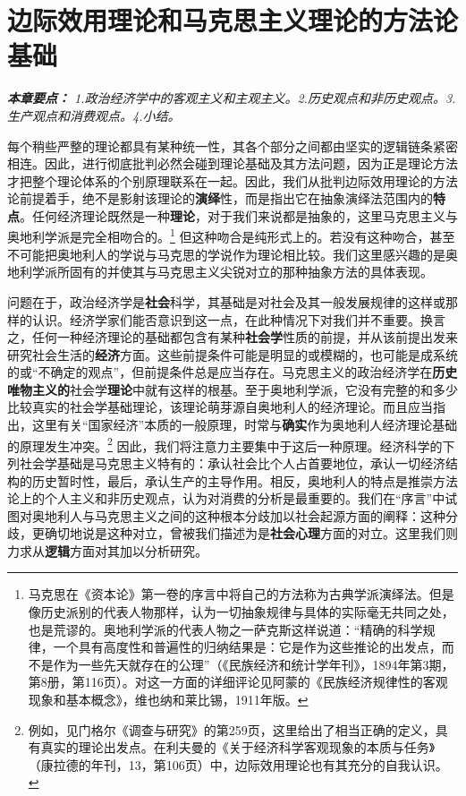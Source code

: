 \documentclass[fontset=fandol, a4paper, 12pt, openright]{ctexbook}
\renewenvironment{quote}
  {\list{}{\rightmargin\leftmargin}%
   \item\relax\small\itshape\color{darkgray}}
  {\endlist}
\begin{document}


\chapter{边际效用理论和马克思主义理论的方法论基础}

\begin{quote}
\small
\textbf{本章要点：} 1.政治经济学中的客观主义和主观主义。2.历史观点和非历史观点。3.生产观点和消费观点。4.小结。
\end{quote}

每个稍些严整的理论都具有某种统一性，其各个部分之间都由坚实的逻辑链条紧密相连。因此，进行彻底批判必然会碰到理论基础及其方法问题，因为正是理论方法才把整个理论体系的个别原理联系在一起。因此，我们从批判边际效用理论的方法论前提着手，绝不是影射该理论的\textbf{演绎}性，而是指出它在抽象演绎法范围内的\textbf{特点}。任何经济理论既然是一种\textbf{理论}，对于我们来说都是抽象的，这里马克思主义与奥地利学派是完全相吻合的。\footnote{马克思在《资本论》第一卷的序言中将自己的方法称为古典学派演绎法。但是像历史派别的代表人物那样，认为一切抽象规律与具体的实际毫无共同之处，也是荒谬的。奥地利学派的代表人物之一萨克斯这样说道：“精确的科学规律，一个具有高度性和普遍性的归纳结果是：它是作为这些推论的出发点，而不是作为一些先天就存在的公理”（《民族经济和统计学年刊》，1894年第3期，第8册，第116页）。对这一方面的详细评论见阿蒙的《民族经济规律性的客观现象和基本概念》，维也纳和莱比锡，1911年版。} 但这种吻合是纯形式上的。若没有这种吻合，甚至不可能把奥地利人的学说与马克思的学说作为理论相比较。我们这里感兴趣的是奥地利学派所固有的并使其与马克思主义尖锐对立的那种抽象方法的具体表现。

问题在于，政治经济学是\textbf{社会}科学，其基础是对社会及其一般发展规律的这样或那样的认识。经济学家们能否意识到这一点，在此种情况下对我们并不重要。换言之，任何一种经济理论的基础都包含有某种\textbf{社会学}性质的前提，并从该前提出发来研究社会生活的\textbf{经济}方面。这些前提条件可能是明显的或模糊的，也可能是成系统的或“不确定的观点”，但前提条件总是应当存在。马克思主义的政治经济学在\textbf{历史唯物主义的}社会学\textbf{理论}中就有这样的根基。至于奥地利学派，它没有完整的和多少比较真实的社会学基础理论，该理论萌芽源自奥地利人的经济理论。而且应当指出，这里有关“国家经济”本质的一般原理，时常与\textbf{确实}作为奥地利人经济理论基础的原理发生冲突。\footnote{例如，见门格尔《调查与研究》的第259页，这里给出了相当正确的定义，具有真实的理论出发点。在利夫曼的《关于经济科学客观现象的本质与任务》（康拉德的年刊，13，第106页）中，边际效用理论也有其充分的自我认识。} 因此，我们将注意力主要集中于这后一种原理。经济科学的下列社会学基础是马克思主义特有的：承认社会比个人占首要地位，承认一切经济结构的历史暂时性，最后，承认生产的主导作用。相反，奥地利人的特点是推崇方法论上的个人主义和非历史观点，认为对消费的分析是最重要的。我们在“序言”中试图对奥地利人与马克思主义之间的这种根本分歧加以社会起源方面的阐释：这种分歧，更确切地说是这种对立，曾被我们描述为是\textbf{社会心理}方面的对立。这里我们则力求从\textbf{逻辑}方面对其加以分析研究。
\end{document}
